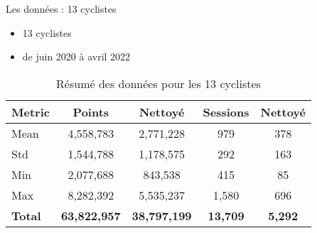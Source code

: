 \documentclass{beamer}
\begin{document}
\begin{frame}{Les données : 13 cyclistes}
    \begin{itemize}
        \item 13 cyclistes
        \item de juin 2020 à avril 2022 
       \end{itemize}
       \begin{table}[ht]
        \centering
        \begin{tabular}{lcccc}
            \hline
            \textbf{Metric} & \textbf{Points} & \textbf{Nettoyé} & \textbf{Sessions} & \textbf{Nettoyé} \\
            \hline
            Mean  & 4,558,783 & 2,771,228 & 979 & 378 \\
            Std   & 1,544,788 & 1,178,575 & 292 & 163 \\
            Min   & 2,077,688 & 843,538   & 415 & 85 \\
            Max   & 8,282,392 & 5,535,237 & 1,580 & 696 \\
            \textbf{Total} & \textbf{63,822,957} & \textbf{38,797,199 }& \textbf{13,709 }& \textbf{5,292} \\
            \hline
        \end{tabular}
        \caption{Résumé des données pour les 13 cyclistes}
        \label{tab:summary_statistics}
    \end{table}
\end{frame}
\end{document}
